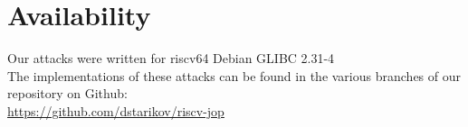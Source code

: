 
\section*{Availability}
Our attacks were written for riscv64 Debian GLIBC 2.31-4\\
The implementations of these attacks can be found in the various branches of our
repository on Github:\\
\url{https://github.com/dstarikov/riscv-jop}







